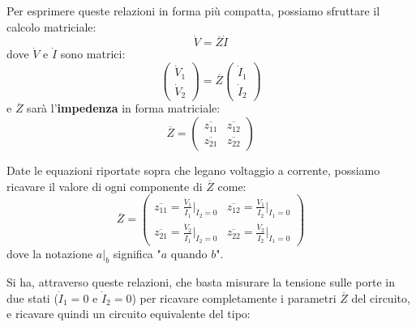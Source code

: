 \documentclass[a4paper,11pt]{article}
\begin{document}
Per esprimere queste relazioni in forma più compatta, possiamo sfruttare il calcolo matriciale:
$$
\dot{V} = \overline{Z} \dot{I}
$$
dove $\dot{V}$ e $\dot{I}$ sono matrici:
$$
\begin{pmatrix}
	\dot{V}_1 \\ \dot{V}_2
\end{pmatrix}
= \overline{Z}
\begin{pmatrix}
	\dot{I}_1 \\ \dot{I}_2
\end{pmatrix}
$$
e $\overline{Z}$ sarà l'\textbf{impedenza} in forma matriciale:
$$
\overline{Z} =
\begin{pmatrix}
	\overline{z_{11}} & \overline{z_{12}} \\ 
	\overline{z_{21}} & \overline{z_{22}} 
\end{pmatrix}
$$

Date le equazioni riportate sopra che legano voltaggio a corrente, possiamo ricavare il valore di ogni componente di $\overline{Z}$ come:
$$
\overline{Z} =
\begin{pmatrix}
	\overline{z_{11}} = \frac{\dot{V}_1}{\dot{I}_1} \Big|_{\dot{I}_2 = 0} & 
	\overline{z_{12}} = \frac{\dot{V}_1}{\dot{I}_2} \Big|_{\dot{I}_1 = 0} \\
	\overline{z_{21}} = \frac{\dot{V}_2}{\dot{I}_1} \Big|_{\dot{I}_2 = 0} &
	\overline{z_{22}} = \frac{\dot{V}_2}{\dot{I}_2} \Big|_{\dot{I}_1 = 0}
\end{pmatrix}
$$
dove la notazione $a \Big|_b$ significa "$a$ quando $b$".

Si ha, attraverso queste relazioni, che basta misurare la tensione sulle porte in due stati ($\dot{I}_1 = 0$ e $\dot{I}_2 = 0$) per ricavare completamente i parametri $\overline{Z}$ del circuito, e ricavare quindi un circuito equivalente del tipo:
\end{document}
